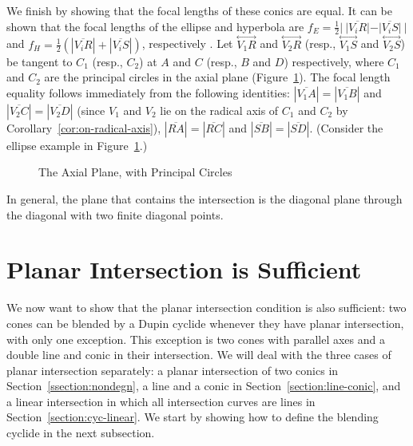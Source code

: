 We finish by showing that the focal lengths of these conics
are equal.
It can be shown that the focal lengths of the ellipse and hyperbola are
$f_E=\frac{1}{2}|\ |\overline{V_iR}|-|\overline{V_iS}|\ |$ and
$f_H=\frac{1}{2}(|\overline{V_iR}|+|\overline{V_iS}|)$, respectively
\cite[Lemma~4.1]{shenethesis}.
Let $\stackrel{\longleftrightarrow}{V_1R}$ and
$\stackrel{\longleftrightarrow}{V_2R}$ (resp.,
$\stackrel{\longleftrightarrow}{V_1S}$ and
$\stackrel{\longleftrightarrow}{V_2S}$) be tangent to $C_1$ (resp., $C_2$) at
$A$ and $C$ (resp., $B$ and $D$) respectively, where $C_1$ and $C_2$ are the 
principal circles in the axial plane (Figure~\ref{fig:Q-RS}). 
The focal length equality follows immediately from the following identities:
$|\overline{V_1A}|=|\overline{V_1B}|$ and 
$|\overline{V_2C}|=|\overline{V_2D}|$ (since $V_1$ and $V_2$ lie on the radical
axis of $C_1$ and $C_2$ by Corollary~\ref{cor:on-radical-axis}),
$|\overline{RA}|=|\overline{RC}|$ and $|\overline{SB}|=|\overline{SD}|$.
(Consider the ellipse example in Figure~\ref{fig:Q-RS}.)
\QED

\begin{figure}
\vspace{7cm}
\caption{The Axial Plane, with Principal Circles}
\label{fig:Q-RS}
\end{figure}

\begin{cor}
In general,
the plane that contains the intersection
is the diagonal plane through the diagonal with two finite diagonal points.
\end{cor}

\section{Planar Intersection is Sufficient}
\label{section:cyclide-non-degen}

We now want to show that the planar intersection condition is also sufficient:
two cones can be blended by a Dupin cyclide whenever
they have planar intersection, with only one exception.
This exception is
two cones with parallel axes and a double line and conic in their intersection.
We will deal with the three cases of planar intersection separately:
a planar intersection of two conics in Section~\ref{ssection:nondegn}, 
a line and a conic in Section~\ref{section:line-conic}, 
and a linear intersection in which all 
intersection curves are lines in Section~\ref{section:cyc-linear}.
We start by showing how to define the blending cyclide in the next subsection.

